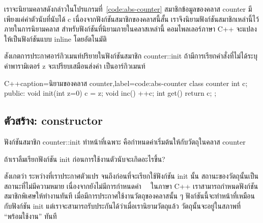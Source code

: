 เรา{\wbr}จะ{\wbr}นิยาม{\wbr}ค{\wbr}ลา{\wbr}ส{\wbr}ดังกล่าว{\wbr}ใน{\wbr}โปรแกรม{\wbr}ที่~\ref{code:abs-counter} สมาชิก{\wbr}ข้อมูล{\wbr}ของ{\wbr}ค{\wbr}ลา{\wbr}ส
{\ct counter} มี{\wbr}เพียงแค่{\wbr}ค่าตัว{\wbr}นับ{\wbr}ที่{\wbr}นับ{\wbr}ได้ {\ct c} เนื่องจาก{\wbr}ฟังก์ชัน{\wbr}สมาชิก{\wbr}ของ{\wbr}ค{\wbr}ลา{\wbr}ส{\wbr}นี้{\wbr}สั้น{\wbr}
เรา{\wbr}จึง{\wbr}นิยาม{\wbr}ฟังก์ชัน{\wbr}สมาชิก{\wbr}เหล่านี้{\wbr}ไว้{\wbr}ภายใน{\wbr}การ{\wbr}นิยาม{\wbr}ค{\wbr}ลา{\wbr}ส
สำหรับ{\wbr}ฟังก์ชัน{\wbr}ที่{\wbr}นิยาม{\wbr}ภายใน{\wbr}ค{\wbr}ลา{\wbr}ส{\wbr}เหล่านี้ คอม{\wbr}ไพล{\wbr}เลอร์{\wbr}ภาษา C++ จะ{\wbr}แปลง{\wbr}ให้{\wbr}เป็น{\wbr}ฟังก์ชัน{\wbr}แบบ{\wbr}
inline โดย{\wbr}อัตโนมัติ{\wbr}

สังเกต{\wbr}การ{\wbr}ประกาศ{\wbr}อาร์กิวเมนท์{\wbr}ปริยาย{\wbr}ใน{\wbr}ฟังก์ชัน{\wbr}สมาชิก {\ct counter::init}
ถ้า{\wbr}มี{\wbr}การ{\wbr}เรียก{\wbr}คำสั่ง{\wbr}ที่{\wbr}ไม่{\wbr}ได้{\wbr}ระบุ{\wbr}ค่า{\wbr}พารามิเตอร์ {\ct z} จะ{\wbr}เปรียบ{\wbr}เสมือน{\wbr}ส่ง{\wbr}ค่า {}
เป็น{\wbr}อาร์กิวเมนท์

\latintext
\begin{codelist}{C++}{caption={\thaitext นิยาม{\wbr}ของ{\wbr}ค{\wbr}ลา{\wbr}ส {\ct counter}\latintext},label=code:abs-counter}
class counter {
  int c;
public:
  void init(int z=0) { c = z; }
  void inc() { ++c; }
  int get() { return c; }
};
\end{codelist}
\thaitext

\subsection{ตัว{\wbr}สร้าง: constructor}
ฟังก์ชัน{\wbr}สมาชิก {\ct counter::init} ทำ{\wbr}หน้าที่{\wbr}เฉพาะ คือ{\wbr}กำหนด{\wbr}ค่า{\wbr}เริ่มต้น{\wbr}ให้{\wbr}กับ{\wbr}วัตถุ{\wbr}ใน{\wbr}ค{\wbr}ลา{\wbr}ส
{\ct counter}

\begin{quiz}{}
ถ้า{\wbr}เรา{\wbr}ลืม{\wbr}เรียก{\wbr}ฟังก์ชัน {\ct init} ก่อน{\wbr}การ{\wbr}ใช้{\wbr}งาน{\wbr}ตัว{\wbr}นับ{\wbr}จะ{\wbr}เกิด{\wbr}อะไร{\wbr}ขึ้น?
\end{quiz}

สังเกต{\wbr}ว่า ระหว่าง{\wbr}ที่{\wbr}เรา{\wbr}ประกาศ{\wbr}ตัวแปร จนถึง{\wbr}ก่อน{\wbr}ที่{\wbr}จะ{\wbr}เรียก{\wbr}ใช้{\wbr}ฟังก์ชัน {\ct init} นั้น{\wbr}
สถานะ{\wbr}ของ{\wbr}วัตถุ{\wbr}นั้น{\wbr}เป็น{\wbr}สถานะ{\wbr}ที่{\wbr}ไม่{\wbr}มี{\wbr}ความหมาย เนื่องจาก{\wbr}ยัง{\wbr}ไม่{\wbr}มี{\wbr}การ{\wbr}กำหนด{\wbr}ค่า \ \ ใน{\wbr}ภาษา{\wbr}
C++ เรา{\wbr}สามารถ{\wbr}กำหนด{\wbr}ฟังก์ชัน{\wbr}สมาชิกพิเศษ{\wbr}ให้{\wbr}ทำงาน{\wbr}ทันที{\wbr}
เมื่อ{\wbr}มี{\wbr}การ{\wbr}ประกาศใช้{\wbr}งาน{\wbr}วัตถุ{\wbr}ของ{\wbr}ค{\wbr}ลา{\wbr}ส{\wbr}นั้น ๆ  ฟังก์ชัน{\wbr}นี้{\wbr}จะ{\wbr}ทำ{\wbr}หน้าที่{\wbr}เหมือน{\wbr}กับ{\wbr}ฟังก์ชัน {\ct init}  แต่{\wbr}เรา{\wbr}จะ{\wbr}สามารถ{\wbr}รับประกัน{\wbr}ได้{\wbr}ว่า{\wbr}เมื่อ{\wbr}เรา{\wbr}นิยาม{\wbr}วัตถุ{\wbr}แล้ว วัตถุ{\wbr}นั้น{\wbr}จะ{\wbr}อยู่{\wbr}ใน{\wbr}สภาพ{\wbr}ที่ ``พร้อม{\wbr}ใช้{\wbr}งาน'' ทันที{\wbr}

